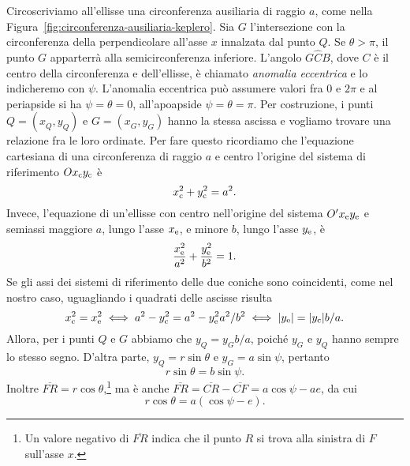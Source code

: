 Circoscriviamo all'ellisse una circonferenza ausiliaria di raggio $a$, come
nella Figura~\ref{fig:circonferenza-ausiliaria-keplero}. Sia $G$ l'intersezione
con la circonferenza della perpendicolare all'asse $x$ innalzata dal punto
$Q$. Se $\theta > \pi$, il punto $G$ apparterrà alla semicirconferenza
inferiore. L'angolo $G\widehat{C}B$, dove $C$ è il centro della circonferenza e
dell'ellisse, è chiamato \emph{anomalia eccentrica} e lo indicheremo con
$\psi$. L'anomalia eccentrica può assumere valori fra $0$ e $2\pi$ e al
periapside si ha $\psi = \theta = 0$, all'apoapside $\psi = \theta = \pi$. Per
costruzione, i punti $Q=(x_Q^{},y_Q^{})$ e $G=(x_G^{},y_G^{})$ hanno la stessa
ascissa e vogliamo trovare una relazione fra le loro ordinate. Per fare questo
ricordiamo che l'equazione cartesiana di una circonferenza di raggio $a$ e
centro l'origine del sistema di riferimento $Ox_\textup{c}y_\textup{c}$ è
\begin{equation}
  x_\textup{c}^2 + y_\textup{c}^2 = a^2.
\end{equation}
Invece, l'equazione di un'ellisse con centro nell'origine del sistema
$O'x_\textup{e}y_\textup{e}$ e semiassi maggiore $a$, lungo l'asse
$x_\textup{e}$, e minore $b$, lungo l'asse $y_\textup{e}$, è
\begin{equation}
    \frac{x_\textup{e}^2}{a^2} + \frac{y_\textup{e}^2}{b^2} = 1.
\end{equation}
Se gli assi dei sistemi di riferimento delle due coniche sono coincidenti, come
nel nostro caso, uguagliando i quadrati delle ascisse risulta
\begin{equation}
  x_\textup{c}^2 = x_\textup{e}^2 \iff a^2 - y_\textup{c}^2 = a^2 -
  y_\textup{e}^2a^2/b^2 \iff \lvert y_\textup{e}\rvert = \lvert y_\textup{c}\rvert b/a.
\end{equation}
Allora, per i punti $Q$ e $G$ abbiamo che $y_Q^{} = y_G^{}b/a$, poiché $y_G^{}$
e $y_Q^{}$ hanno sempre lo stesso segno. D'altra parte, $y_Q^{} = r\sin\theta$ e
$y_G^{} = a\sin\psi$, pertanto
\begin{equation}
  \label{eq:r-sin-chi}
  r\sin\theta = b\sin\psi.
\end{equation}
Inoltre $\overline{FR} =
r\cos\theta$,\footnote{Un
  valore negativo di $\overline{FR}$ indica che il punto $R$ si trova alla
  sinistra di $F$ sull'asse $x$.} ma è anche $\overline{FR} = \overline{CR} -
\overline{CF} = a\cos\psi - ae$, da cui
\begin{equation}
  \label{eq:r-cos-chi}
  r\cos\theta = a(\cos\psi - e).
\end{equation}
